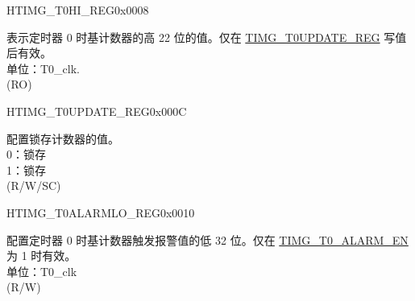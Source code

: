 \begin{register}{H}{TIMG\_T0HI\_REG}{0x0008}\label{regdesc:TIMGTXHIREG}
%
%
\regnewline%
\begin{regdesc}\begin{reglist}
\label{fielddesc:TIMGTXHI}\item [TIMG\_T0\_HI] 表示定时器 0 时基计数器的高 22 位的值。仅在 \hyperref[regdesc:TIMGTXUPDATEREG]{TIMG\_T0UPDATE\_REG} 写值后有效。\\ 
单位：T0\_clk. \\ 
(RO)
\end{reglist}\end{regdesc}
\end{register}


\begin{register}{H}{TIMG\_T0UPDATE\_REG}{0x000C}\label{regdesc:TIMGTXUPDATEREG}
%
%
\regnewline%
\begin{regdesc}\begin{reglist}
\label{fielddesc:TIMGTXUPDATE}\item [TIMG\_T0\_UPDATE] 配置锁存计数器的值。\\ 
0：锁存 \\ 
1：锁存 \\ 
(R/W/SC)
\end{reglist}\end{regdesc}
\end{register}


\begin{register}{H}{TIMG\_T0ALARMLO\_REG}{0x0010}\label{regdesc:TIMGTXALARMLOREG}
%
\regnewline%
\begin{regdesc}\begin{reglist}
\label{fielddesc:TIMGTXALARMLO}\item [TIMG\_T0\_ALARM\_LO] 配置定时器 0 时基计数器触发报警值的低 32 位。仅在 \hyperref[fielddesc:TIMGTXALARMEN]{TIMG\_T0\_ALARM\_EN} 为 1 时有效。\\ 
单位：T0\_clk \\ 
(R/W)
\end{reglist}\end{regdesc}
\end{register}


